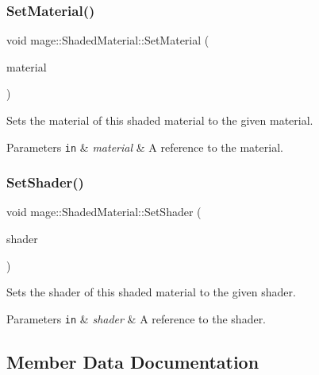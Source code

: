 \subsubsection{\texorpdfstring{Set\+Material()}{SetMaterial()}}
{\footnotesize\ttfamily void mage\+::\+Shaded\+Material\+::\+Set\+Material (\begin{DoxyParamCaption}\item[{const \hyperlink{structmage_1_1_material}{Material} \&}]{material }\end{DoxyParamCaption})}

Sets the material of this shaded material to the given material.


\begin{DoxyParams}[1]{Parameters}
\mbox{\tt in}  & {\em material} & A reference to the material. \\
\hline
\end{DoxyParams}
\hypertarget{structmage_1_1_shaded_material_a65646872fce0961e7ac346be162e89ec}{}\label{structmage_1_1_shaded_material_a65646872fce0961e7ac346be162e89ec} 
\subsubsection{\texorpdfstring{Set\+Shader()}{SetShader()}}
{\footnotesize\ttfamily void mage\+::\+Shaded\+Material\+::\+Set\+Shader (\begin{DoxyParamCaption}\item[{const \hyperlink{structmage_1_1_combined_shader}{Combined\+Shader} \&}]{shader }\end{DoxyParamCaption})}

Sets the shader of this shaded material to the given shader.


\begin{DoxyParams}[1]{Parameters}
\mbox{\tt in}  & {\em shader} & A reference to the shader. \\
\hline
\end{DoxyParams}


\subsection{Member Data Documentation}
\hypertarget{structmage_1_1_shaded_material_a319e1ca2103c50f84ce0605b08bd34b4}{}\label{structmage_1_1_shaded_material_a319e1ca2103c50f84ce0605b08bd34b4} 
